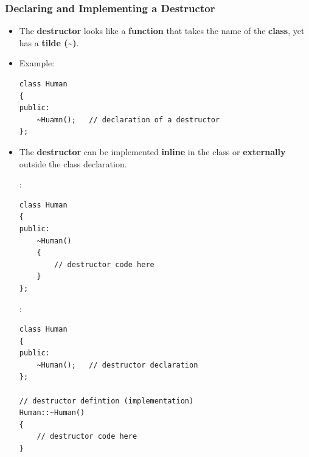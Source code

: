 \documentclass[10pt]{article}
\newcommand{\pbreak}{\vspace{30pt}}
\begin{document}
\subsubsection{Declaring and Implementing a Destructor}
\begin{itemize}
	\item The \textbf{destructor} looks like a \textbf{function} that takes the name of the \textbf{class}, yet has a \textbf{tilde (\textasciitilde{})}.

	\item Example:
	\begin{verbatim}
class Human 
{
public:
	~Huamn();	// declaration of a destructor
};
	\end{verbatim}

	\pbreak

\item The \textbf{destructor} can be implemented \textbf{inline} in the class or \textbf{externally} outside the class declaration.

	:
\begin{verbatim}
class Human
{
public:	
	~Human()
	{
		// destructor code here
	}
};

\end{verbatim}

:
\begin{verbatim}
class Human
{
public:
	~Human();	// destructor declaration
};

// destructor defintion (implementation)
Human::~Human()
{
	// destructor code here
}

\end{verbatim}

\end{itemize}

\newpage
\end{document}
